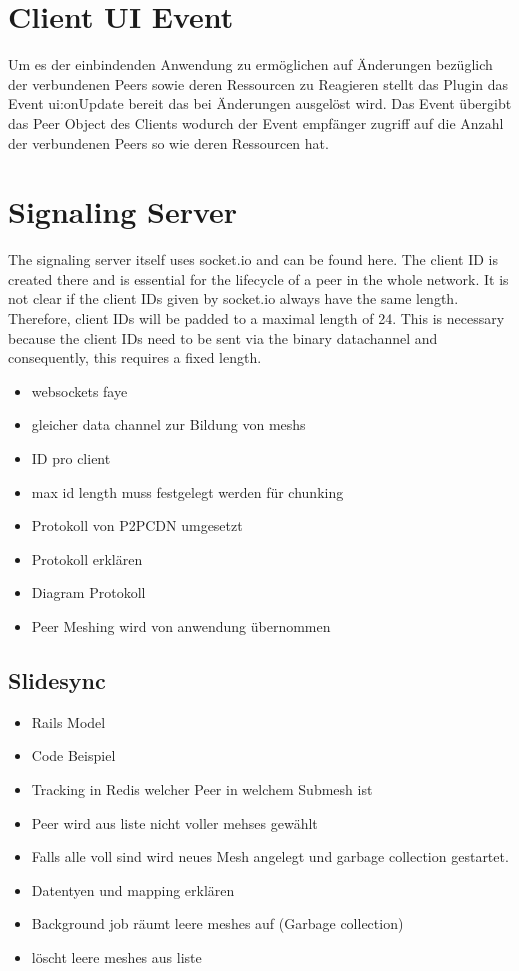 \section{Client UI Event}
Um es der einbindenden Anwendung zu ermöglichen auf Änderungen bezüglich der verbundenen Peers sowie deren Ressourcen zu Reagieren stellt das Plugin das Event ui:onUpdate bereit das bei Änderungen ausgelöst wird. Das Event übergibt das Peer Object des Clients wodurch der Event empfänger zugriff auf die Anzahl der verbundenen Peers so wie deren Ressourcen hat. 

\section{Signaling Server}
The signaling server itself uses socket.io and can be found here. The client ID is created there and is essential for the lifecycle of a peer in the whole network. It is not clear if the client IDs given by socket.io always have the same length. Therefore, client IDs will be padded to a maximal length of 24. This is necessary because the client IDs need to be sent via the binary datachannel and consequently, this requires a fixed length.


\begin{itemize}
  \item websockets faye
  \item gleicher data channel zur Bildung von meshs
  \item ID pro client
  \item max id length muss festgelegt werden für chunking
  \item Protokoll von P2PCDN umgesetzt
  \item Protokoll erklären
  \item Diagram Protokoll
  \item Peer Meshing wird von anwendung übernommen
\end{itemize}

\subsection{Slidesync}
\begin{itemize}
	\item Rails Model
	\item Code Beispiel
	\item Tracking in Redis welcher Peer in welchem Submesh ist
	\item Peer wird aus liste nicht voller mehses gewählt
	\item Falls alle voll sind wird neues Mesh angelegt und garbage collection gestartet.
	\item Datentyen und mapping erklären
	\item Background job räumt leere meshes auf (Garbage collection)
	\item 	löscht leere meshes aus liste
\end{itemize}

